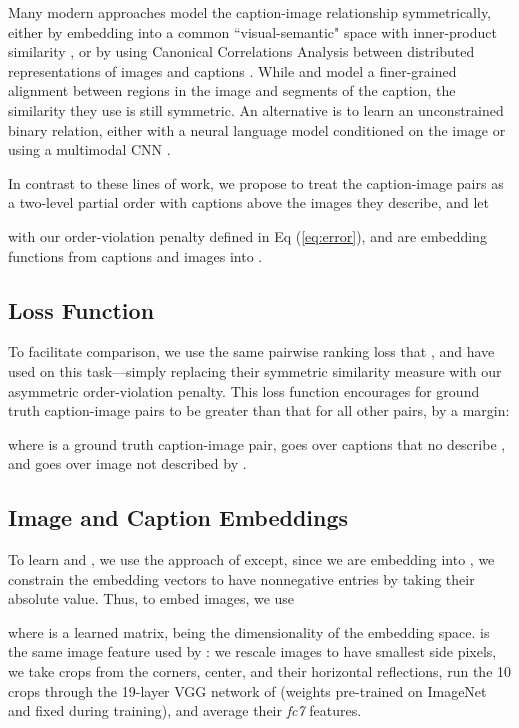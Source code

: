 \documentclass{article} \usepackage{iclr2016_conference,times}
\begin{document}
Many modern approaches model the caption-image relationship symmetrically, either by embedding into a common ``visual-semantic" space with inner-product similarity  \citep{socher2014grounded, kiros2014}, or by using Canonical Correlations Analysis between distributed representations of images and captions \citep{klein2015fisher}. While \citet{karpathydeep} and \citet{plummer2015flickr30k} model a finer-grained alignment between regions in the image and segments of the caption, the similarity they use is still symmetric.
An alternative is to learn an unconstrained binary relation, either with a neural language model conditioned on the image \citep{vinyals2015show,mao2015} or using a multimodal CNN \citep{ma2015multimodal}.

In contrast to  these lines of work, we propose to treat the caption-image pairs as a two-level partial order with captions above the images they describe, and let 

with  our order-violation penalty defined in Eq (\ref{eq:error}), and  are embedding functions from captions and images into .

\subsection{Loss Function}
To facilitate comparison, we use the same pairwise ranking loss that \citet{socher2014grounded}, \citet{kiros2014} and \citet{karpathydeep} have used on this task---simply replacing their symmetric similarity measure with our asymmetric order-violation penalty. This loss function encourages  for ground truth caption-image pairs to be greater than that for all other pairs, by a margin:

where  is a ground truth caption-image pair,  goes over captions that no describe , and  goes over image not described by .

\subsection{Image and Caption Embeddings}
To learn  and , we use the approach of \citet{kiros2014}  except, since we are embedding into , we constrain the embedding vectors to have nonnegative entries by taking their absolute value. Thus, to embed images, we use 

where  is a learned  matrix,  being the dimensionality of the embedding space.  is the same image feature used by \citet{klein2015fisher}: we rescale images to have smallest side  pixels, we take  crops from the corners, center, and their horizontal reflections, run the 10 crops through the 19-layer VGG network of \citet{vgg} (weights pre-trained on ImageNet and fixed during training), and average their \emph{fc7} features. 
\end{document}
